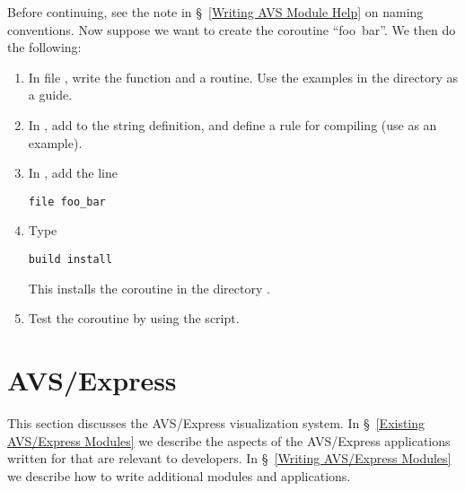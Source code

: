 Before continuing, see the note in \S~\ref{Writing AVS Module Help}
on naming conventions.
Now suppose we want to create the coroutine ``foo~bar''.
We then do the following:
\begin{enumerate}

\item
In file , write the function 
and a  routine.
Use the examples in the  directory as a guide.

\item
In , add  to the 
string definition, and define a rule for compiling 
(use  as an example).

\item
In , add the line
\begin{display}\begin{verbatim}
file foo_bar
\end{verbatim}\end{display}

\item
Type
\begin{display}\begin{verbatim}
build install
\end{verbatim}\end{display}
This installs the coroutine in the directory
.

\item
Test the coroutine by using the  script.

\end{enumerate}



\section{AVS/Express}
\label{AVS/Express}

This section discusses the AVS/Express visualization system.
In \S~\ref{Existing AVS/Express Modules} we describe the aspects of the
AVS/Express applications written for \parflow{} that are relevant to
developers.
In \S~\ref{Writing AVS/Express Modules} we describe how to write additional
modules and applications.


